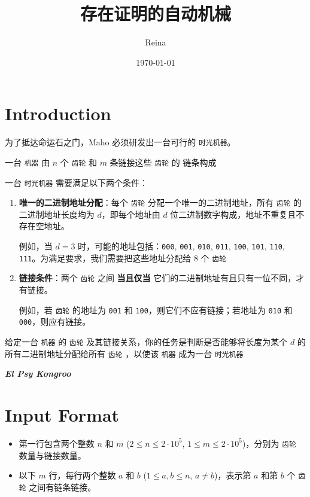 \documentclass[a4paper, 12pt]{article}
\begin{document}
    \title{存在证明的自动机械}
    \author{Reina}
    \date{\today}
    \maketitle
    \section*{Introduction}
    为了抵达命运石之门，Maho 必须研发出一台可行的 \texttt{时光机器}。

    一台 \texttt{机器} 由 \(n\) 个 \texttt{齿轮} 和 \(m\) 条链接这些 \texttt{齿轮} 的
    链条构成

    一台 \texttt{时光机器} 需要满足以下两个条件：

    \begin{enumerate}
        \item \textbf{唯一的二进制地址分配}：每个 \texttt{齿轮} 分配一个唯一的二进制地址，所有 \texttt{齿轮} 的二进制地址长度均为 \(d\)，即每个地址由 \(d\) 位二进制数字构成，地址不重复且不存在空地址。

        例如，当 \(d = 3\) 时，可能的地址包括：\texttt{000}, \texttt{001}, \texttt{010}, \texttt{011}, \texttt{100}, \texttt{101}, \texttt{110}, \texttt{111}。为满足要求，我们需要把这些地址分配给 8 个 \texttt{齿轮}

        \item \textbf{链接条件}：两个 \texttt{齿轮} 之间 \textbf{当且仅当} 它们的二进制地址有且只有一位不同，才有链接。

        例如，若 \texttt{齿轮} 的地址为 \texttt{001} 和 \texttt{100}，则它们不应有链接；若地址为 \texttt{010} 和 \texttt{000}，则应有链接。
    \end{enumerate}

    给定一台 \texttt{机器} 的 \texttt{齿轮} 及其链接关系，你的任务是判断是否能够将长度为某个 $d$ 的所有二进制地址分配给所有 \texttt{齿轮} ，以使该 \texttt{机器} 成为一台 \texttt{时光机器}

    \textbf{\textit{El Psy Kongroo}}

    \section*{Input Format}
    \begin{itemize}
        \item 第一行包含两个整数 \(n\) 和 \(m\) (\(2 \le n \le 2 \cdot 10^5\), \(1 \le m \le 2 \cdot 10^5\))，分别为 \texttt{齿轮} 数量与链接数量。
        \item 以下 \(m\) 行，每行两个整数 \(a\) 和 \(b\) (\(1 \le a, b \le n\), \(a \neq b\))，表示第 \(a\) 和第 \(b\) 个 \texttt{齿轮} 之间有链条链接。
    \end{itemize}
\end{document}
